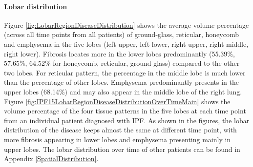 \paragraph{Lobar distribution}
Figure \ref{fig:LobarRegionDiseaseDistribution} shows the average volume percentage (across all time points from all patients) of ground-glass, reticular, honeycomb and emphysema in the five lobes (left upper, left lower, right upper, right middle, right lower). Fibrosis locates more in the lower lobes predominantly (55.39\%, 57.65\%, 64.52\% for honeycomb, reticular, ground-glass) compared to the other two lobes. For reticular pattern, the percentage in the middle lobe is much lower than the percentage of other lobes. Emphysema predominantly presents in the upper lobes (68.14\%) and may also appear in the middle lobe of the right lung. Figure \ref{fig:IPF15LobarRegionDiseaseDistributionOverTimeMain} shows the volume percentage of the four tissue patterns in the five lobes at each time point from an individual patient diagnosed with IPF. As shown in the figures, the lobar distribution of the disease keeps almost the same at different time point, with more fibrosis appearing in lower lobes and emphysema presenting mainly in upper lobes. The lobar distribution over time of other patients can be found in Appendix \ref{SpatialDistribution}.
\newpage

